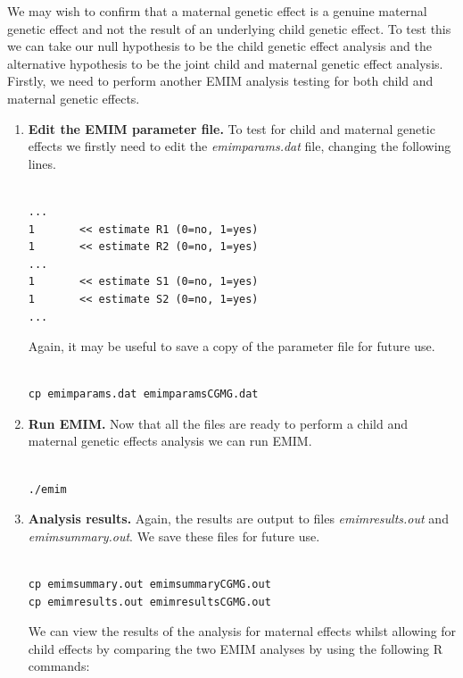\documentclass[a4paper,12pt]{article}
\begin{document}
We may wish to confirm that a maternal genetic effect is a genuine maternal genetic effect and not the result of an underlying child genetic effect. To test this we can take our null hypothesis to be the child genetic effect analysis and the alternative hypothesis to be the joint child and maternal genetic effect analysis. Firstly, we need to perform another EMIM analysis testing for both child and maternal genetic effects. 
\begin{enumerate}

\item {\bf Edit the EMIM parameter file.} To test for child and maternal genetic effects we firstly need to edit the {\it emimparams.dat} file, changing the following lines. \vspace{0.35cm} \begin{lstlisting}

...
1       << estimate R1 (0=no, 1=yes)
1       << estimate R2 (0=no, 1=yes)
...
1       << estimate S1 (0=no, 1=yes)
1       << estimate S2 (0=no, 1=yes)
...

\end{lstlisting} \vspace{0.35cm}Again, it may be useful to save a copy of the parameter file for future use. \vspace{0.35cm} \begin{lstlisting}

cp emimparams.dat emimparamsCGMG.dat

\end{lstlisting} \vspace{0.35cm}
\item {\bf Run EMIM.} Now that all the files are ready to perform a child and maternal genetic effects analysis we can run EMIM. \vspace{0.35cm} \begin{lstlisting}

./emim

\end{lstlisting} \vspace{0.35cm}
\item {\bf Analysis results.} Again, the results are output to files {\it emimresults.out} and {\it emimsummary.out}. We save these files for future use. \vspace{0.35cm} \begin{lstlisting}

cp emimsummary.out emimsummaryCGMG.out
cp emimresults.out emimresultsCGMG.out

\end{lstlisting} \vspace{0.35cm}We can view the results of the analysis for maternal effects whilst allowing for child effects by comparing the two EMIM analyses by using the following R commands: \vspace{0.35cm} \begin{lstlisting}


\end{lstlisting}
\end{enumerate}
\end{document}
